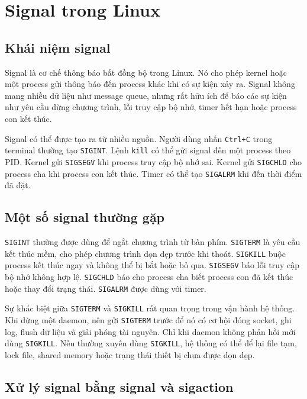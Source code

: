 \documentclass[11pt]{article}
\newcommand{\code}[1]{\texttt{#1}}
\begin{document}
\section{Signal trong Linux}

\subsection{Khái niệm signal}

Signal là cơ chế thông báo bất đồng bộ trong Linux. Nó cho phép kernel hoặc một process gửi thông báo đến process khác khi có sự kiện xảy ra. Signal không mang nhiều dữ liệu như message queue, nhưng rất hữu ích để báo các sự kiện như yêu cầu dừng chương trình, lỗi truy cập bộ nhớ, timer hết hạn hoặc process con kết thúc.

Signal có thể được tạo ra từ nhiều nguồn. Người dùng nhấn \code{Ctrl+C} trong terminal thường tạo \code{SIGINT}. Lệnh \code{kill} có thể gửi signal đến một process theo PID. Kernel gửi \code{SIGSEGV} khi process truy cập bộ nhớ sai. Kernel gửi \code{SIGCHLD} cho process cha khi process con kết thúc. Timer có thể tạo \code{SIGALRM} khi đến thời điểm đã đặt.

\subsection{Một số signal thường gặp}

\code{SIGINT} thường được dùng để ngắt chương trình từ bàn phím. \code{SIGTERM} là yêu cầu kết thúc mềm, cho phép chương trình dọn dẹp trước khi thoát. \code{SIGKILL} buộc process kết thúc ngay và không thể bị bắt hoặc bỏ qua. \code{SIGSEGV} báo lỗi truy cập bộ nhớ không hợp lệ. \code{SIGCHLD} báo cho process cha biết process con đã kết thúc hoặc thay đổi trạng thái. \code{SIGALRM} được dùng với timer.

Sự khác biệt giữa \code{SIGTERM} và \code{SIGKILL} rất quan trọng trong vận hành hệ thống. Khi dừng một daemon, nên gửi \code{SIGTERM} trước để nó có cơ hội đóng socket, ghi log, flush dữ liệu và giải phóng tài nguyên. Chỉ khi daemon không phản hồi mới dùng \code{SIGKILL}. Nếu thường xuyên dùng \code{SIGKILL}, hệ thống có thể để lại file tạm, lock file, shared memory hoặc trạng thái thiết bị chưa được dọn dẹp.

\subsection{Xử lý signal bằng signal và sigaction}
\end{document}
